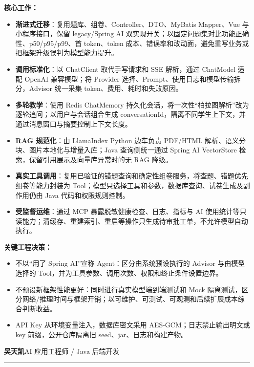 \textbf{核心工作：}
\begin{itemize}[parsep=0.4ex]
  \item \textbf{渐进式迁移}：复用题库、组卷、Controller、DTO、MyBatis Mapper、Vue 与小程序接口，保留 legacy/Spring AI 双实现开关；以固定问题集对比功能正确性、p50/p95/p99、首 token、token 成本、错误率和改动面，避免重写业务或把框架升级误判为模型能力提升。
  \item \textbf{调用标准化}：以 ChatClient 取代手写请求和 SSE 解析，通过 ChatModel 适配 OpenAI 兼容模型；将 Provider 选择、Prompt、使用日志和模型传输拆分，Advisor 统一采集 token、费用、耗时和失败原因。
  \item \textbf{多轮教学}：使用 Redis ChatMemory 持久化会话，将一次性“柏拉图解析”改为逐轮追问；以用户与会话组合生成 conversationId，隔离不同学生上下文，并通过消息窗口与摘要控制上下文长度。
  \item \textbf{RAG 规范化}：由 LlamaIndex Python 边车负责 PDF/HTML 解析、语义分块、图片本地化与增量入库；Java 查询侧统一通过 Spring AI VectorStore 检索，保留引用展示及向量库异常时的无 RAG 降级。
  \item \textbf{真实工具调用}：复用已验证的错题查询和确定性组卷服务，将查题、错题优先组卷等能力封装为 Tool；模型只选择工具和参数，数据库查询、试卷生成及副作用仍由 Java 代码和权限规则控制。
  \item \textbf{受监督运维}：通过 MCP 暴露脱敏健康检查、日志、指标与 AI 使用统计等只读能力；清缓存、重建索引、重启等操作只生成待审批工单，不允许模型自动执行。
\end{itemize}

\textbf{关键工程决策：}
\begin{itemize}[parsep=0.35ex]
  \item 不以“用了 Spring AI”宣称 Agent：区分由系统预设执行的 Advisor 与由模型选择的 Tool，并为工具参数、调用次数、权限和终止条件设置边界。
  \item 不预设新框架性能更好：同时进行真实模型端到端测试和 Mock 隔离测试，区分网络/推理时间与框架开销；以可维护、可测试、可观测和后续扩展成本综合判断收益。
  \item API Key 从环境变量注入，数据库密文采用 AES-GCM；日志禁止输出明文或 key 前缀，公开仓库隔离旧 seed、jar、日志和构建产物。
\end{itemize}

\newpage
\noindent\textbf{吴天凯}\hfill AI 应用工程师 / Java 后端开发\\[-0.4ex]
{\color{ICBlue}\rule{\textwidth}{0.5pt}}


